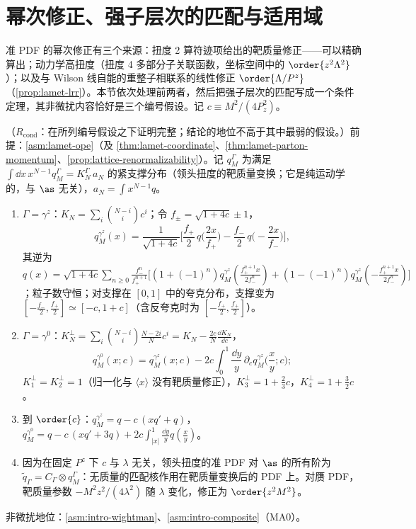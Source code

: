 \section{幂次修正、强子层次的匹配与适用域}\label{sec:lamet-power}

准 PDF 的幂次修正有三个来源：扭度 2 算符迹项给出的靶质量修正——可以精确算出；动力学高扭度（扭度 4 多部分子关联函数，坐标空间中的 $\order{z^2\Lambda^2}$）；以及与 Wilson 线自能的重整子相联系的线性修正 $\order{\Lambda/P^z}$（\cref{prop:lamet-lrr}）。本节依次处理前两者，然后把强子层次的匹配写成一个条件定理，其非微扰内容恰好是三个编号假设。记 $c\equiv M^2/(4P_z^2)$。

\begin{proposition}\label{prop:lamet-tmc}
（$R_{\mathrm{cond}}$：在所列编号假设之下证明完整；结论的地位不高于其中最弱的假设。）前提：\cref{asm:lamet-ope}（及 \cref{thm:lamet-coordinate}、\cref{thm:lamet-parton-momentum}、\cref{prop:lattice-renormalizability}）。记 $q^\Gamma_M$ 为满足 $\int\dd x\,x^{N-1}q^\Gamma_M=K^\Gamma_N\,a_N$ 的紧支撑分布（领头扭度的靶质量变换；它是纯运动学的，与 $\as$ 无关），$a_N=\int x^{N-1}q$。
\begin{enumerate}[label=(\alph*),leftmargin=2em,itemsep=1pt,topsep=2pt]
\item $\Gamma=\gamma^z$：$K_N=\sum_i\binom{N-i}ic^i$；令 $f_\pm=\sqrt{1+4c}\pm1$，
\begin{equation}\label{eq:lamet-tmc-z}
q^{\gamma^z}_M(x)=\frac1{\sqrt{1+4c}}\Big[\frac{f_+}2\,q\Big(\frac{2x}{f_+}\Big)-\frac{f_-}2\,q\Big(-\frac{2x}{f_-}\Big)\Big],
\end{equation}%
其逆为 $q(x)=\sqrt{1+4c}\sum_{n\ge0}\frac{f_-^n}{f_+^{n+1}}\big[(1+(-1)^n)q^{\gamma^z}_M(\frac{f_+^{n+1}x}{2f_-^n})+(1-(-1)^n)q^{\gamma^z}_M(-\frac{f_+^{n+1}x}{2f_-^n})\big]$；粒子数守恒；对支撑在 $[0,1]$ 中的夸克分布，支撑变为 $[-\frac{f_-}2,\frac{f_+}2]\simeq[-c,1+c]$（含反夸克时为 $[-\frac{f_+}2,\frac{f_+}2]$）。
\item $\Gamma=\gamma^0$：$K^\perp_N=\sum_i\binom{N-i}i\frac{N-2i}Nc^i=K_N-\frac{2c}N\frac{\dd K_N}{\dd c}$，
\begin{equation}\label{eq:lamet-tmc-0}
q^{\gamma^0}_M(x;c)=q^{\gamma^z}_M(x;c)-2c\int_0^1\frac{\dd y}y\,\partial_c q^{\gamma^z}_M\Big(\frac xy;c\Big);
\end{equation}
$K^\perp_1=K^\perp_2=1$（归一化与 $\langle x\rangle$ 没有靶质量修正），$K^\perp_3=1+\frac23c$，$K^\perp_4=1+\frac32c$。
\item 到 $\order{c}$：$q^{\gamma^z}_M=q-c\,(xq'+q)$，$q^{\gamma^0}_M=q-c\,(xq'+3q)+2c\int_{|x|}^1\frac{\dd y}yq(\frac xy)$。
\item 因为在固定 $P^z$ 下 $c$ 与 $\lambda$ 无关，领头扭度的准 PDF 对 $\as$ 的所有阶为 $\tilde q_\Gamma=C_\Gamma\otimes q^\Gamma_M$：无质量的匹配核作用在靶质量变换后的 PDF 上。对赝 PDF，靶质量参数 $-M^2z^2/(4\lambda^2)$ 随 $\lambda$ 变化，修正为 $\order{z^2M^2}$。
\end{enumerate}
非微扰地位：\cref{asm:intro-wightman}、\cref{asm:intro-composite}（MA0）。
\end{proposition}

